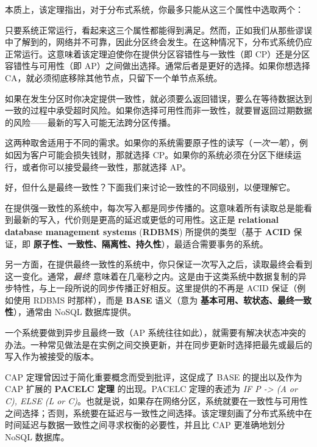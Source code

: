 本质上，该定理指出，对于分布式系统，你最多只能从这三个属性中选取两个：


只要系统正常运行，看起来这三个属性都能得到满足。然而，正如我们从那些谬误中了解到的，网络并不可靠，因此分区终会发生。在这种情况下，分布式系统仍应正常运行。这意味着该定理迫使你在提供分区容错性与一致性（即 CP）还是分区容错性与可用性（即 AP）之间做出选择。通常后者是更好的选择。如果你想选择 CA，就必须彻底移除其他节点，只留下一个单节点系统。

如果在发生分区时你决定提供一致性，就必须要么返回错误，要么在等待数据达到一致的过程中承受超时风险。如果你选择可用性而非一致性，就要冒返回过期数据的风险——最新的写入可能无法跨分区传播。

这两种取舍适用于不同的需求。如果你的系统需要原子性的读写（\emph{一次一笔}），例如因为客户可能会损失钱财，那就选择 CP。如果你的系统必须在分区下继续运行，或者你可以接受最终一致性，那就选择 AP。

好，但什么是最终一致性？下面我们来讨论一致性的不同级别，以便理解它。

\label{idx:296}
\label{idx:297}
在提供强一致性的系统中，每次写入都是同步传播的。这意味着所有读取总是能看到最新的写入，代价则是更高的延迟或更低的可用性。这正是 \textbf{relational database management systems }(\textbf{RDBMS}) 所提供的类型（基于 \textbf{ACID} 保证，即 \textbf{原子性、一致性、隔离性、持久性}），最适合需要事务的系统。

\label{idx:298}
另一方面，在提供最终一致性的系统中，你只保证一次写入之后，读取最终会看到这一变化。通常，\emph{最终} 意味着在几毫秒之内。这是由于这类系统中数据复制的异步特性，与上一段所说的同步传播正好相反。这里提供的不再是 ACID 保证（例如使用 RDBMS 时那样），而是 \textbf{BASE} 语义（意为 \textbf{基本可用、软状态、最终一致性}），通常由 NoSQL 数据库提供。

一个系统要做到异步且最终一致（AP 系统往往如此），就需要有解决状态冲突的办法。一种常见做法是在实例之间交换更新，并在同步更新时选择把最先或最后的写入作为被接受的版本。

\label{idx:299}
CAP 定理曾因过于简化重要概念而受到批评，这促成了 BASE 的提出以及作为 CAP 扩展的 \textbf{PACELC 定理} 的出现。PACELC 定理的表述为 \emph{IF P -> (A or C), ELSE (L or C)}。也就是说，如果存在网络分区，系统就要在一致性与可用性之间选择；否则，系统要在延迟与一致性之间选择。该定理刻画了分布式系统中在时间延迟与数据一致性之间寻求权衡的必要性，并且比 CAP 更准确地划分 NoSQL 数据库。


